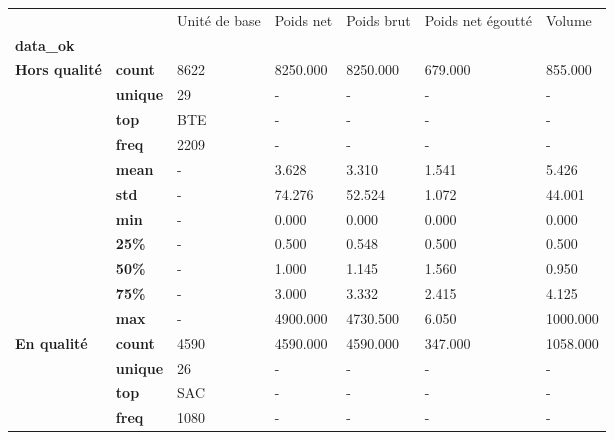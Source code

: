 \begin{tabularx}{\linewidth}{lXXXXXX}
\toprule
           &     & Unité de base &  Poids net &  Poids brut &  Poids net égoutté &    Volume \\
\textbf{data\_ok} & {} &               &            &             &                    &           \\
\midrule
\multirow{11}{*}{\textbf{Hors qualité}} & \textbf{count} &          8622 &   8250.000 &    8250.000 &            679.000 &   855.000 \\
           & \textbf{unique} &            29 &          - &           - &                  - &         - \\
           & \textbf{top} &           BTE &          - &           - &                  - &         - \\
           & \textbf{freq} &          2209 &          - &           - &                  - &         - \\
           & \textbf{mean} &             - &      3.628 &       3.310 &              1.541 &     5.426 \\
           & \textbf{std} &             - &     74.276 &      52.524 &              1.072 &    44.001 \\
           & \textbf{min} &             - &      0.000 &       0.000 &              0.000 &     0.000 \\
           & \textbf{25\%} &             - &      0.500 &       0.548 &              0.500 &     0.500 \\
           & \textbf{50\%} &             - &      1.000 &       1.145 &              1.560 &     0.950 \\
           & \textbf{75\%} &             - &      3.000 &       3.332 &              2.415 &     4.125 \\
           & \textbf{max} &             - &   4900.000 &    4730.500 &              6.050 &  1000.000 \\
\cline{1-7}
\multirow{11}{*}{\textbf{En qualité}} & \textbf{count} &          4590 &   4590.000 &    4590.000 &            347.000 &  1058.000 \\
           & \textbf{unique} &            26 &          - &           - &                  - &         - \\
           & \textbf{top} &           SAC &          - &           - &                  - &         - \\
           & \textbf{freq} &          1080 &          - &           - &                  - &         - \\

\end{tabularx}
